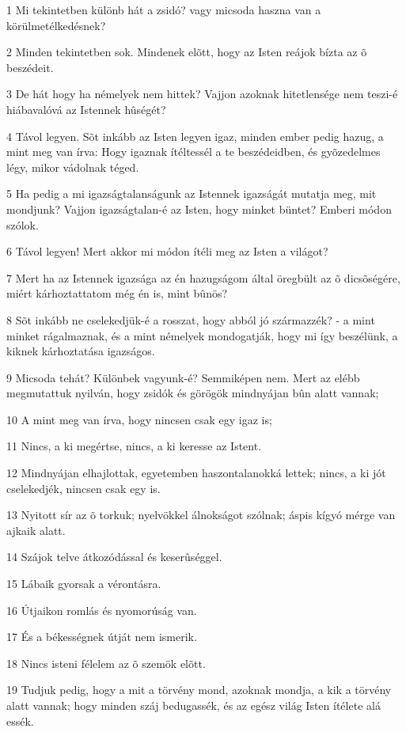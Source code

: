 \par 1 Mi tekintetben különb hát a zsidó? vagy micsoda haszna van a körülmetélkedésnek?
\par 2 Minden tekintetben sok. Mindenek elõtt, hogy az Isten reájok bízta az õ beszédeit.
\par 3 De hát hogy ha némelyek nem hittek? Vajjon azoknak hitetlensége nem teszi-é hiábavalóvá az Istennek hûségét?
\par 4 Távol legyen. Sõt inkább az Isten legyen igaz, minden ember pedig hazug, a mint meg van írva: Hogy igaznak ítéltessél a te beszédeidben, és  gyõzedelmes légy, mikor vádolnak téged.
\par 5 Ha pedig a mi igazságtalanságunk az Istennek igazságát mutatja meg, mit mondjunk? Vajjon igazságtalan-é az Isten, hogy minket büntet? Emberi módon szólok.
\par 6 Távol legyen! Mert akkor mi módon ítéli meg az Isten a világot?
\par 7 Mert ha az Istennek igazsága az én hazugságom által öregbült az õ dicsõségére, miért kárhoztattatom még én is, mint bûnös?
\par 8 Sõt inkább ne cselekedjük-é a rosszat, hogy abból jó származzék? - a mint minket rágalmaznak, és a mint némelyek mondogatják, hogy mi így beszélünk, a kiknek kárhoztatása igazságos.
\par 9 Micsoda tehát? Különbek vagyunk-é? Semmiképen nem. Mert az elébb megmutattuk nyilván, hogy zsidók és görögök mindnyájan bûn alatt vannak;
\par 10 A mint meg van írva, hogy nincsen csak egy igaz is;
\par 11 Nincs, a ki megértse, nincs, a ki keresse az Istent.
\par 12 Mindnyájan elhajlottak, egyetemben haszontalanokká lettek; nincs, a ki jót cselekedjék, nincsen csak egy is.
\par 13 Nyitott sír az õ torkuk; nyelvökkel álnokságot szólnak; áspis kígyó mérge van ajkaik alatt.
\par 14 Szájok telve átkozódással és keserûséggel.
\par 15 Lábaik gyorsak a vérontásra.
\par 16 Útjaikon romlás és nyomorúság van.
\par 17 És a békességnek útját nem ismerik.
\par 18 Nincs isteni félelem az õ szemök elõtt.
\par 19 Tudjuk pedig, hogy a mit a törvény mond, azoknak mondja, a kik a törvény alatt vannak; hogy minden száj bedugassék, és az egész világ Isten ítélete alá essék.
